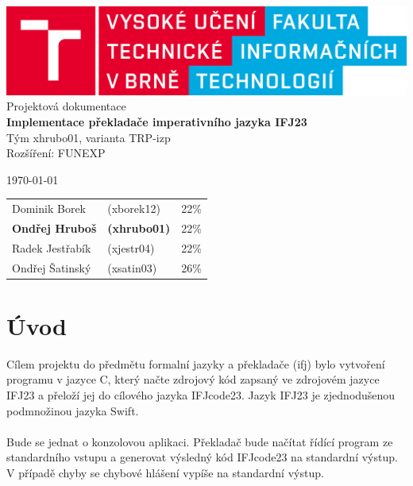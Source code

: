 \documentclass[12pt]{article}
\begin{document}
    \begin{titlepage}
        \begin{center}
            \includegraphics[width=0.77\linewidth]{img/fit_logo.png} \\
            \Huge{Projektová dokumentace} \\
            \Large{\textbf{Implementace překladače imperativního jazyka IFJ23}} \\
            \Large{Tým xhrubo01, varianta TRP-izp} \\ 
            \Large{Rozšíření: FUNEXP}\\
        \end{center}
        \begin{minipage}{0.4 \textwidth}
			{\Large \today}
		\end{minipage}
		\hfill
		\begin{minipage}[r]{0.6 \textwidth}
			\normalsize
            \begin{flushright}
                \begin{tabular}{l l l}
    				Dominik Borek & (xborek12) & 22\%\\
    				\textbf{Ondřej Hruboš} & \textbf{(xhrubo01)} & 22\%\\
    				Radek Jestřabík & (xjestr04)  & 22\%\\
    				Ondřej Šatinský & (xsatin03)  & 26\%\\
    			\end{tabular}
            \end{flushright}
		\end{minipage}
      \newpage
    \end{titlepage}

\begin{center}
\renewcommand{\contentsname}{Obsah}
    \tableofcontents
    \clearpage
\end{center}
 
\section{Úvod}
Cílem projektu do předmětu formalní jazyky a překladače (ifj) bylo vytvoření programu v jazyce C, který načte zdrojový kód zapsaný ve zdrojovém jazyce IFJ23 a přeloží jej do cílového jazyka IFJcode23. Jazyk IFJ23 je zjednodušenou podmnožinou jazyka Swift. 
\\  \\
Bude se jednat o konzolovou aplikaci. Překladač bude načítat řídící program ze standardního vstupu a generovat výsledný kód IFJcode23 na standardní výstup. V případě chyby se chybové hlášení vypíše na standardní výstup.
\end{document}
